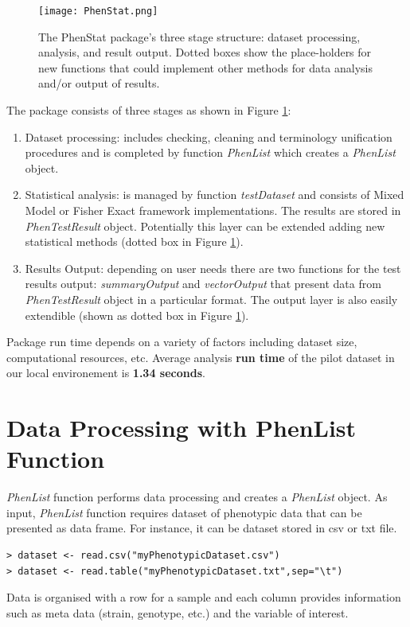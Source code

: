 \documentclass[12pt,a4paper]{article}
\begin{document}
\begin{figure}[!htpb]%
\centerline{\texttt{[image: PhenStat.png]}}
\caption{The PhenStat package's three stage structure: dataset processing, analysis, and result output. Dotted boxes show the place-holders for new functions that could implement other methods for data analysis and/or output of results.}\label{fig:01}
\end{figure}

The package consists of three stages as shown in Figure \ref{fig:01}:
\begin{enumerate}
\item Dataset processing: includes checking, cleaning and terminology unification procedures and is completed by function \textit{PhenList} which creates a \textit{PhenList} object. 
\item Statistical analysis: is managed by function \textit{testDataset} and consists of Mixed Model or Fisher Exact framework implementations. The results are stored in \textit{PhenTestResult} object. 
Potentially this layer can be extended adding new statistical methods (dotted box in Figure \ref{fig:01}). 
\item Results Output: depending on user needs there are two functions for the test results output: \textit{summaryOutput} 
and \textit{vectorOutput} that present data from \textit{PhenTestResult} object in a particular format. The output layer is also easily extendible (shown as dotted box in Figure \ref{fig:01}).
\end{enumerate}

Package run time depends on a variety of factors including dataset size, computational resources, etc. Average analysis \textbf{run time} of the pilot dataset in our local environement is \textbf{1.34 seconds}. 

\section{Data Processing with PhenList Function}
\textit{PhenList} function performs data processing and creates a \textit{PhenList} object. 
As input, \textit{PhenList} function requires dataset of phenotypic data that can be presented as data frame. For instance, it can be dataset stored in csv or txt file. 
\begingroup
    \fontsize{8pt}{12pt}\selectfont
\begin{verbatim}
> dataset <- read.csv("myPhenotypicDataset.csv")
> dataset <- read.table("myPhenotypicDataset.txt",sep="\t")
\end{verbatim}
\endgroup
Data is organised with a row for a sample and each column provides information such as meta data (strain, genotype, etc.) and the variable of interest.
\end{document}
